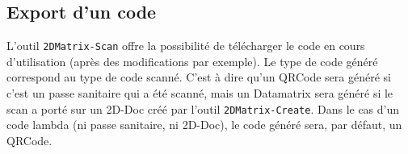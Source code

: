 \subsection{Export d'un code}
L'outil \texttt{2DMatrix-Scan} offre la possibilité de télécharger le code en cours d'utilisation (après des modifications par exemple). Le type de code généré correspond au type de code scanné. C'est à dire qu'un QRCode sera généré si c'est un passe sanitaire qui a été scanné, mais un Datamatrix sera généré si le scan a porté sur un 2D-Doc créé par l'outil \texttt{2DMatrix-Create}. Dans le cas d'un code lambda (ni passe sanitaire, ni 2D-Doc), le code généré sera, par défaut, un QRCode.


